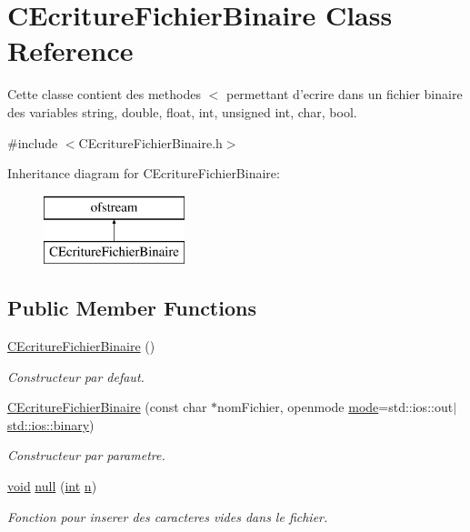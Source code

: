 \hypertarget{class_c_ecriture_fichier_binaire}{\section{C\-Ecriture\-Fichier\-Binaire Class Reference}
\label{class_c_ecriture_fichier_binaire}
}


Cette classe contient des methodes $<$ permettant d'ecrire dans un fichier binaire des variables string, double, float, int, unsigned int, char, bool.  




{\ttfamily \#include $<$C\-Ecriture\-Fichier\-Binaire.\-h$>$}

Inheritance diagram for C\-Ecriture\-Fichier\-Binaire\-:\begin{figure}[H]
\begin{center}
\leavevmode
\includegraphics[height=2.000000cm]{class_c_ecriture_fichier_binaire}
\end{center}
\end{figure}
\subsection*{Public Member Functions}
\begin{DoxyCompactItemize}
\item 
\hyperlink{group__utilitaire_ga5b5846202001fecd71cd2a0afbbdb494}{C\-Ecriture\-Fichier\-Binaire} ()
\begin{DoxyCompactList}\small\item\em Constructeur par defaut. \end{DoxyCompactList}\item 
\hyperlink{group__utilitaire_gad19b9753aa12a9f25fd0febc3c899024}{C\-Ecriture\-Fichier\-Binaire} (const char $\ast$nom\-Fichier, openmode \hyperlink{glew_8h_a1e71d9c196e4683cc06c4b54d53f7ef5}{mode}=std\-::ios\-::out$\vert$\hyperlink{glew_8h_a0ace813ee1f7020974174eb65d53ff0d}{std\-::ios\-::binary})
\begin{DoxyCompactList}\small\item\em Constructeur par parametre. \end{DoxyCompactList}\item 
\hyperlink{wglew_8h_aeea6e3dfae3acf232096f57d2d57f084}{void} \hyperlink{group__utilitaire_ga7145545254c30909311d3b1ef0bdd07a}{null} (\hyperlink{wglew_8h_a500a82aecba06f4550f6849b8099ca21}{int} \hyperlink{glew_8h_a4cf5f6946cc0a65dbe0d2406017e469c}{n})
\begin{DoxyCompactList}\small\item\em Fonction pour inserer des caracteres vides dans le fichier. \end{DoxyCompactList}\end{DoxyCompactItemize}
